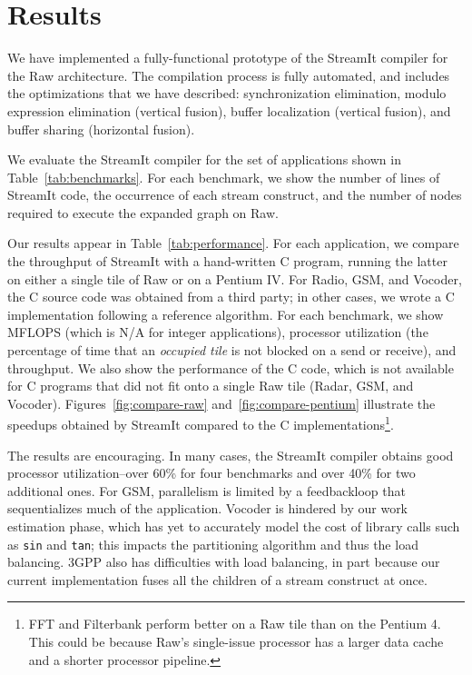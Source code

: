 \section{Results}
\label{sec:results}

We have implemented a fully-functional prototype of the StreamIt
compiler for the Raw architecture.  The compilation process is fully
automated, and includes the optimizations that we have described:
synchronization elimination, modulo expression elimination (vertical
fusion), buffer localization (vertical fusion), and buffer sharing
(horizontal fusion).

We evaluate the StreamIt compiler for the set of applications shown in
Table~\ref{tab:benchmarks}.  For each benchmark, we show the number of
lines of StreamIt code, the occurrence of each stream construct, and
the number of nodes required to execute the expanded graph on Raw.

Our results appear in Table~\ref{tab:performance}.  For each
application, we compare the throughput of StreamIt with a hand-written
C program, running the latter on either a single tile of Raw or on a
Pentium IV.  For Radio, GSM, and Vocoder, the C source code was
obtained from a third party; in other cases, we wrote a C
implementation following a reference algorithm.  For each benchmark,
we show MFLOPS (which is N/A for integer applications), processor
utilization (the percentage of time that an {\it occupied tile} is not
blocked on a send or receive), and throughput.  We also show the
performance of the C code, which is not available for C programs that
did not fit onto a single Raw tile (Radar, GSM, and Vocoder).
Figures~\ref{fig:compare-raw} and~\ref{fig:compare-pentium} illustrate
the speedups obtained by StreamIt compared to the C
implementations\footnote{FFT and Filterbank perform better on a Raw
tile than on the Pentium 4.  This could be because Raw's single-issue
processor has a larger data cache and a shorter processor pipeline.}.

The results are encouraging.  In many cases, the StreamIt compiler
obtains good processor utilization--over 60\% for four benchmarks and
over 40\% for two additional ones.  For GSM, parallelism is limited by
a feedbackloop that sequentializes much of the application.  Vocoder
is hindered by our work estimation phase, which has yet to accurately
model the cost of library calls such as {\tt sin} and {\tt tan}; this
impacts the partitioning algorithm and thus the load balancing.  3GPP
also has difficulties with load balancing, in part because our current
implementation fuses all the children of a stream construct at once.

